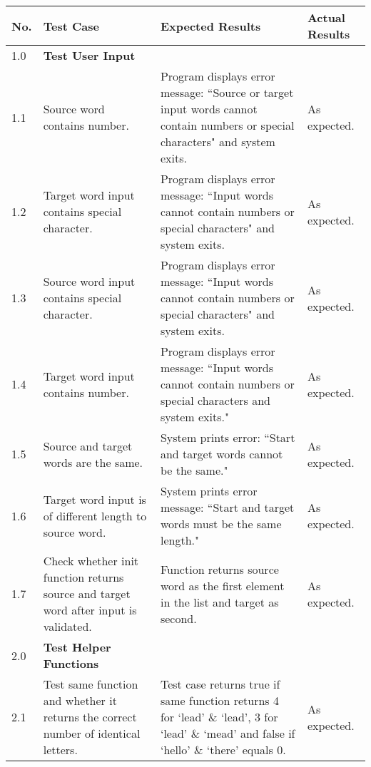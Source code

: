 \documentclass[12pt, a4]{report}
\begin{document}
	
	\begin{tabular}{ |p{0.5cm}|p{5cm}|p{5cm}|p{5cm}| }
		\hline
		No. & Test Case & Expected Results & Actual Results \\
		\hline
		1.0 & \textbf{Test User Input} &  & \\
		1.1 & Source word contains number. & Program displays error message: ``Source or target input words cannot contain numbers or special characters" and system exits. & As expected.\\
		1.2 & Target word input contains special character. & Program displays error message: ``Input words cannot contain numbers or special characters" and system exits. & As expected. \\
		1.3 & Source word input contains special character. & Program displays error message: ``Input words cannot contain numbers or special characters" and system exits. & As expected. \\
		1.4 & Target word input contains number. & Program displays error message: ``Input words cannot contain numbers or special characters and system exits." & As expected. \\
		1.5 & Source and target words are the same. & System prints error: ``Start and target words cannot be the same." & As expected. \\
		1.6 & Target word input is of different length to source word. & System prints error message: ``Start and target words must be the same length." & As expected. \\
		1.7 & Check whether init function returns source and target word after input is validated. & Function returns source word as the first element in the list and target as second. & As expected.\\
		2.0 & \textbf{Test Helper Functions} &  &  \\
		2.1 & Test same function and whether it returns the correct number of identical letters. & Test case returns true if same function returns 4 for `lead' \& `lead', 3 for `lead' \& `mead' and false if `hello' \& `there' equals 0. & As expected. \\
		\hline
	\end{tabular}
	
	\pagebreak[4]
	
\end{document}
